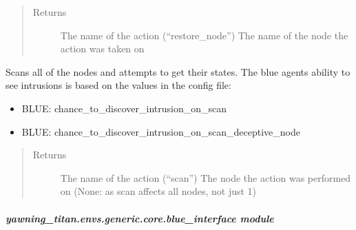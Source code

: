 \documentclass[letterpaper,10pt,english]{sphinxmanual}
\begin{document}
\begin{fulllineitems}
\begin{fulllineitems}
\begin{quote}
\begin{description}
\item[{Returns}] \leavevmode
\sphinxAtStartPar
The name of the action (“restore\_node”)
The name of the node the action was taken on

\end{description}\end{quote}

\end{fulllineitems}


\begin{fulllineitems}
\label{\detokenize{source/yawning_titan.envs.generic.core:yawning_titan.envs.generic.core.blue_action_set.BlueActionSet.scan_all_nodes}}
\sphinxAtStartPar
Scans all of the nodes and attempts to get their states. The blue agents ability to see intrusions is based on
the values in the config file:
\begin{itemize}
\item {}
\sphinxAtStartPar
BLUE: chance\_to\_discover\_intrusion\_on\_scan

\item {}
\sphinxAtStartPar
BLUE: chance\_to\_discover\_intrusion\_on\_scan\_deceptive\_node

\end{itemize}
\begin{quote}\begin{description}
\item[{Returns}] \leavevmode
\sphinxAtStartPar
The name of the action (“scan”)
The node the action was performed on (None: as scan affects all nodes, not just 1)

\end{description}\end{quote}

\end{fulllineitems}


\end{fulllineitems}



\subparagraph{yawning\_titan.envs.generic.core.blue\_interface module}
\label{\detokenize{source/yawning_titan.envs.generic.core:module-yawning_titan.envs.generic.core.blue_interface}}\label{\detokenize{source/yawning_titan.envs.generic.core:yawning-titan-envs-generic-core-blue-interface-module}}
\end{document}
